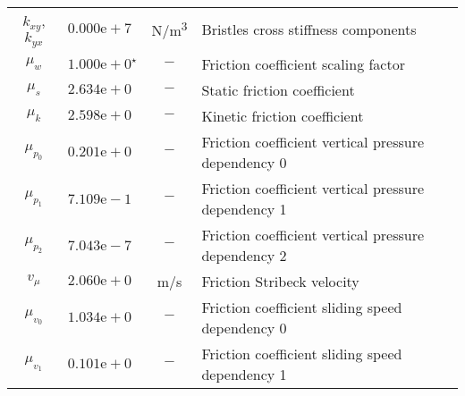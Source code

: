 \begin{longtable}{cccl}
$k_{xy}$, $k_{yx}$ & $0.000\mathrm{e+}7\phantom{^\star}$ & \unit[per-mode=symbol]{\newton\per\cubic\meter}             & Bristles cross stiffness components \\
$\mu_w$            & $1.000\mathrm{e+}0^\star$           & $-$                                                         & Friction coefficient scaling factor \\
$\mu_s$            & $2.634\mathrm{e+}0\phantom{^\star}$ & $-$                                                         & Static friction coefficient \\
$\mu_k$            & $2.598\mathrm{e+}0\phantom{^\star}$ & $-$                                                         & Kinetic friction coefficient \\
$\mu_{p_0}$        & $0.201\mathrm{e+}0\phantom{^\star}$ & $-$                                                         & Friction coefficient vertical pressure dependency 0 \\
$\mu_{p_1}$        & $7.109\mathrm{e-}1\phantom{^\star}$ & $-$                                                         & Friction coefficient vertical pressure dependency 1 \\
$\mu_{p_2}$        & $7.043\mathrm{e-}7\phantom{^\star}$ & $-$                                                         & Friction coefficient vertical pressure dependency 2 \\
$v_\mu$            & $2.060\mathrm{e+}0\phantom{^\star}$ & \unit[per-mode=symbol]{\meter\per\second}                   & Friction Stribeck velocity \\
$\mu_{v_0}$        & $1.034\mathrm{e+}0\phantom{^\star}$ & $-$                                                         & Friction coefficient sliding speed dependency 0 \\
$\mu_{v_1}$        & $0.101\mathrm{e+}0\phantom{^\star}$ & $-$                                                         & Friction coefficient sliding speed dependency 1 \\
\bottomrule
%
\end{longtable}